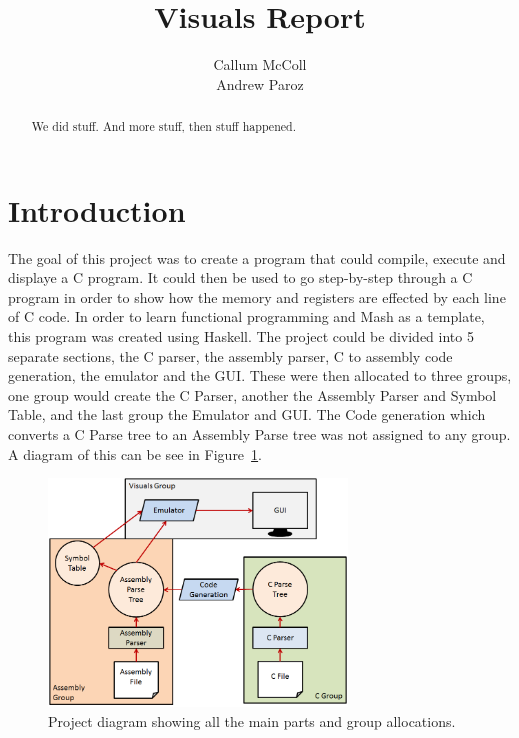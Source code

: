 \documentclass[10point]{article}
\begin{document}
\title{Visuals Report}
\author{Callum McColl\\
	    Andrew Paroz}
		
\maketitle

\begin{abstract}
We did stuff. And more stuff, then stuff happened.
\end{abstract}

\tableofcontents

\listoffigures

\section{Introduction}
The goal of this project was to create a program that could compile, execute and displaye a C program. It could then be used to go step-by-step through a C program in order to show how the memory and registers are effected by each line of C code. In order to learn functional programming and Mash as a template, this program was created using Haskell. The project could be divided into 5 separate sections, the C parser, the assembly parser, C to assembly code generation, the emulator and the GUI. These were then allocated to three groups, one group would create the C Parser, another the Assembly Parser and Symbol Table, and the last group the Emulator and GUI. The Code generation which converts a C Parse tree to an Assembly Parse tree was not assigned to any group. A diagram of this can be see in Figure~\ref{fig:ProjectDiagram}.

\begin{figure}[h]
\centering
\includegraphics[width=300px]{ProjectDiagram}
\caption{Project diagram showing all the main parts and group allocations.}
\label{fig:ProjectDiagram}
\end{figure}
\end{document}
